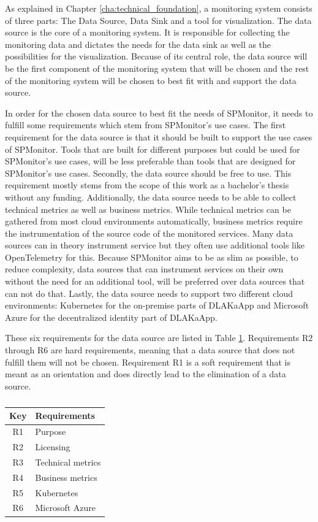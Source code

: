 As explained in Chapter \ref{cha:technical_foundation}, a monitoring system consists of three parts:
The Data Source, Data Sink and a tool for visualization.
The data source is the core of a monitoring system. It is responsible for collecting the monitoring data
and dictates the needs for the data sink as well as the possibilities for the visualization.
Because of its central role, the data source will be the first component of the monitoring system that will be chosen
and the rest of the monitoring system will be chosen to best fit with and support the data source.

In order for the chosen data source to best fit the needs of SPMonitor, it needs to fulfill some requirements
which stem from SPMonitor's use cases. The first requirement for the data source is that it should be built
to support the use cases of SPMonitor. Tools that are built for different purposes but could be used for SPMonitor's
use cases, will be less preferable than tools that are designed for SPMonitor's use cases.
Secondly, the data source should be free to use. This requirement mostly stems from the scope of this work
as a bachelor's thesis without any funding.
Additionally, the data source needs to be able to collect technical metrics as well as business metrics.
While technical metrics can be gathered from most cloud environments automatically, business metrics
require the instrumentation of the source code of the monitored services. Many data sources can in theory
instrument service but they often use additional tools like OpenTelemetry for this. Because SPMonitor aims
to be as slim as possible, to reduce complexity, data sources that can instrument services on their own without
the need for an additional tool, will be preferred over data sources that can not do that.
Lastly, the data source needs to support two different cloud environments: Kubernetes for the on-premise parts
of DLAKaApp and Microsoft Azure for the decentralized identity part of DLAKaApp.

These six requirements for the data source are listed in Table \ref{tab:data_source_requirements}.
Requirements R2 through R6 are hard requirements, meaning that a data source that does not fulfill them
will not be chosen. Requirement R1 is a soft requirement that is meant as an orientation and does directly
lead to the elimination of a data source.

\begin{table}[]
\centering
\begin{tabular}{c|l}
Key & Requirements \\
\hline
R1 & Purpose \\
R2 & Licensing \\
R3 & Technical metrics \\
R4 & Business metrics \\
R5 & Kubernetes \\
R6 & Microsoft Azure \\
\end{tabular}
\caption{}
\label{tab:data_source_requirements}
\end{table}

